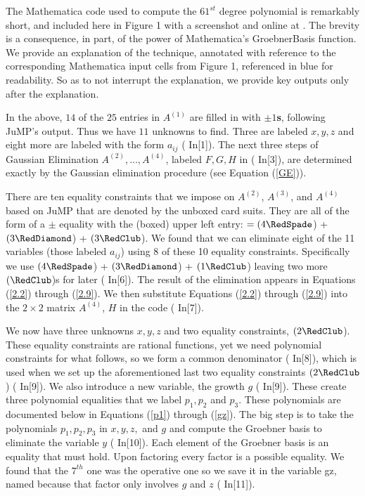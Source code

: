 \documentclass[reqno]{amsart}
\numberwithin{equation}{section}
\begin{document}
The Mathematica code used to compute the $61^{st}$ degree polynomial is remarkably short, and included here in Figure 1 with a screenshot and online at \cite{githubrepo}.  The brevity is a consequence, in part,
of the power of Mathematica's GroebnerBasis function. We provide an explanation of the technique, annotated with reference to the corresponding Mathematica input cells from Figure 1, referenced in {\color{blue} blue} for readability. So as to not interrupt the explanation, we provide key outputs only after the explanation. 






In the above, $14$ of the $25$ entries in $A^{(1)}$
are filled in with {\color{red} \bf $\pm1 $s},
following JuMP's output. Thus we have $11$ unknowns to find. Three are labeled $x,y,z$ and eight more are labeled with the form $a_{ij}$ ({\color{blue} In[1]}). The next three steps of Gaussian Elimination
$A^{(2)},\ldots,A^{(4)}$, labeled $F,G,H$ in ({\color{blue} In[3]}), are determined exactly
by the Gaussian elimination procedure 
(see Equation (\ref{GE})). 


There are ten equality
constraints that we impose on $A^{(2)}$, $A^{(3)}$, and $A^{(4)}$
based on JuMP
that are denoted by the unboxed card suits. 
They are all of the form of a $\pm$ equality with
the (boxed) upper left entry: 
$=(4\RedSpade$) + $(3\RedDiamond$) + $(3\RedClub$).
We found that we can eliminate eight of the 11 variables
(those labeled $a_{ij}$)
using 8 of these 10 equality constraints.  Specifically
we use  $(4\RedSpade$) + $(3\RedDiamond$) + $(1\RedClub$)
leaving two more $(\RedClub$)s for later  ({\color{blue} In[6]}).
The result of the elimination appears in Equations (\ref{2.2}) through (\ref{2.9}).
We then substitute Equations (\ref{2.2}) through (\ref{2.9}) into the $2 \times 2$
matrix $A^{(4)}$, $H$ in the code ({\color{blue} In[7]}).

We now have three unknowns $x,y,z$ and two equality constraints, $(2\RedClub$).  These equality constraints
are rational functions, yet we need polynomial constraints
for what follows, so we form a common denominator
({\color{blue} In[8]}), which is used when we set up
the aforementioned last two equality constraints
$(2\RedClub$) ({\color{blue} In[9]}). We also introduce
a new variable, the growth $g$ ({\color{blue} In[9]}).
These create three polynomial equalities that we
label $p_1,p_2$ and $p_3$.  These polynomials
are documented below in Equations (\ref{p1}) through (\ref{gz}). The big step is to take the polynomials
$p_1,p_2,p_3$ in $x,y,z,$ and $g$ and
compute the
Groebner basis to eliminate the variable $y$ ({\color{blue} In[10]}).  Each element of the
Groebner basis is an equality that must hold.
Upon factoring every factor is a possible equality.
We found that the $7^{th}$ one was the operative one
so we save it in the variable gz,
named because that factor only involves $g$ and $z$ ({\color{blue} In[11]}).
\end{document}
